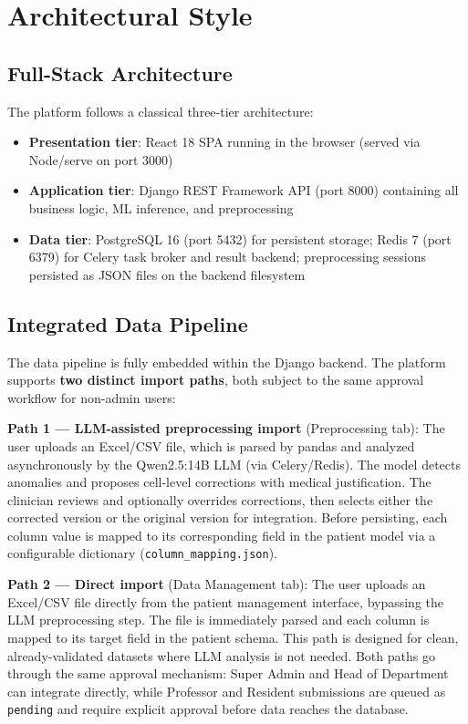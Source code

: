 \documentclass[12pt,a4paper,twoside]{report}
\begin{document}
\section{Architectural Style}\label{sec:archstyle}

\subsection{Full-Stack Architecture}

The platform follows a classical three-tier architecture:
\begin{itemize}
  \item \textbf{Presentation tier}: React 18 SPA running in the browser (served via Node/serve on port 3000)
  \item \textbf{Application tier}: Django REST Framework API (port 8000) containing all business logic, ML inference, and preprocessing
  \item \textbf{Data tier}: PostgreSQL 16 (port 5432) for persistent storage; Redis 7 (port 6379) for Celery task broker and result backend; preprocessing sessions persisted as JSON files on the backend filesystem
\end{itemize}

\subsection{Integrated Data Pipeline}

The data pipeline is fully embedded within the Django backend. The platform supports \textbf{two distinct import paths}, both subject to the same approval workflow for non-admin users:

\textbf{Path 1 — LLM-assisted preprocessing import} (Preprocessing tab): The user uploads an Excel/CSV file, which is parsed by pandas and analyzed asynchronously by the Qwen2.5:14B LLM (via Celery/Redis). The model detects anomalies and proposes cell-level corrections with medical justification. The clinician reviews and optionally overrides corrections, then selects either the corrected version or the original version for integration. Before persisting, each column value is mapped to its corresponding field in the patient model via a configurable dictionary (\texttt{column\_mapping.json}).

\textbf{Path 2 — Direct import} (Data Management tab): The user uploads an Excel/CSV file directly from the patient management interface, bypassing the LLM preprocessing step. The file is immediately parsed and each column is mapped to its target field in the patient schema. This path is designed for clean, already-validated datasets where LLM analysis is not needed. Both paths go through the same approval mechanism: Super Admin and Head of Department can integrate directly, while Professor and Resident submissions are queued as \texttt{pending} and require explicit approval before data reaches the database.
\end{document}
